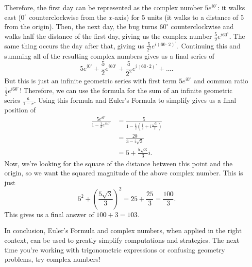 \documentclass{article}
\begin{document}
Therefore, the first day can be represented as the complex number $5e^{i0^\circ}$: it walks east ($0^\circ$ counterclockwise from the $x$-axis) for $5$ units (it walks to a distance of $5$ from the origin). Then, the next day, the bug turns $60^\circ$ counterclockwise and walks half the distance of the first day, giving us the complex number $\frac{5}{2}e^{i60^\circ}$. The same thing occurs the day after that, giving us $\frac{5}{2^2}e^{i(60\cdot2)^\circ}$. Continuing this and summing all of the resulting complex numbers gives us a final series of
\[5e^{i0^\circ}+\frac{5}{2}e^{i60^\circ}+\frac{5}{2^2}e^{i(60\cdot2)^\circ}+\dots.\]
But this is just an infinite geometric series with first term $5e^{i0^\circ}$ and common ratio $\frac{1}{2}e^{i60^\circ}$! Therefore, we can use the formula for the sum of an infinite geometric series $\frac{a}{1-r}$. Using this formula and Euler's Formula to simplify gives us a final position of
\begin{align*}
\frac{5e^{i0^\circ}}{1-\frac{1}{2}e^{i60^\circ}}&=\frac{5}{1-\frac{1}{2}\left(\frac{1}{2}+i\frac{\sqrt{3}}{2}\right)} \\
&=\frac{20}{3-i\sqrt{3}} \\
&=5+\frac{5\sqrt{3}}{3}i.
\end{align*}
Now, we're looking for the square of the distance between this point and the origin, so we want the squared magnitude of the above complex number. This is just
\[5^2+\left(\frac{5\sqrt{3}}{3}\right)^2=25+\frac{25}{3}=\frac{100}{3}.\]
This gives us a final answer of $100+3=\boxed{103}$.

In conclusion, Euler's Formula and complex numbers, when applied in the right context, can be used to greatly simplify computations and strategies. The next time you're working with trigonometric expressions or confusing geometry problems, try complex numbers!
\end{document}
